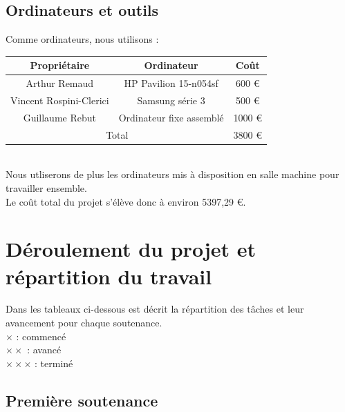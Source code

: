 \documentclass[10pt, titlepage]{report}
\begin{document}
\section{Ordinateurs et outils}

Comme ordinateurs, nous utilisons :\\

\begin{tabular}{|c|c|c|}
\hline
Propriétaire & Ordinateur & Coût\\
\hline
Arthur Remaud & HP Pavilion 15-n054sf & 600 \euro\\
\hline
Vincent Rospini-Clerici & Samsung série 3 & 500 \euro\\
\hline
Guillaume Rebut & Ordinateur fixe assemblé & 1000 \euro\\
\hline
\multicolumn{2}{|c|}{Total } & 3800 \euro\\
\hline
\end{tabular}\\
Nous utliserons de plus les ordinateurs mis à disposition en salle machine pour travailler ensemble.\\

Le coût total du projet s'élève donc à environ 5397,29 \euro.

\chapter{Déroulement du projet et répartition du travail}

Dans les tableaux ci-dessous est décrit la répartition des tâches et leur avancement pour chaque soutenance.\\
$\times$ : commencé\\
$\times \times$ : avancé\\
$\times \times \times$ : terminé

\section{Première soutenance}
\end{document}
